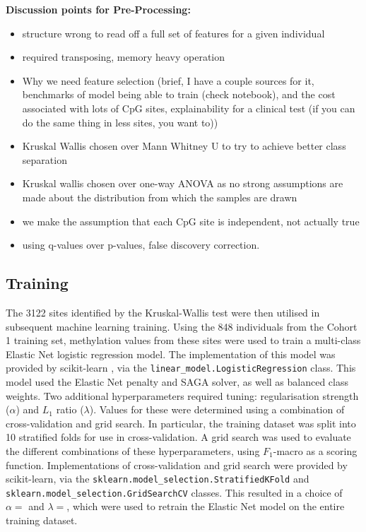 \documentclass{article}
\begin{document}
\vspace{1cm}
\textbf{Discussion points for Pre-Processing:}
\begin{itemize}
    \item structure wrong to read off a full set of features for a given individual
    \item required transposing, memory heavy operation
    \item Why we need feature selection (brief, I have a couple sources for it, benchmarks of model being able to train (check notebook), and the cost associated with lots of CpG sites, explainability for a clinical test (if you can do the same thing in less sites, you want to))
    \item Kruskal Wallis chosen over Mann Whitney U to try to achieve better class separation
    \item Kruskal wallis chosen over one-way ANOVA as no strong assumptions are made about the distribution from which the samples are drawn
    \item we make the assumption that each CpG site is independent, not actually true
    \item using q-values over p-values, false discovery correction.
\end{itemize}

\subsection{Training} \label{sec:training}

The \num{3122} sites identified by the Kruskal-Wallis test were then utilised in subsequent machine learning training. Using the 848 individuals from the Cohort 1 training set, methylation values from these sites were used to train a multi-class Elastic Net logistic regression model. The implementation of this model was provided by scikit-learn \cite{scikit-learn}, via the \verb|linear_model.LogisticRegression| class. This model used the Elastic Net penalty and SAGA solver, as well as balanced class weights. Two additional hyperparameters required tuning: regularisation strength (\(\alpha\)) and \(L_1\) ratio (\(\lambda\)). Values for these were determined using a combination of cross-validation and grid search. In particular, the training dataset was split into 10 stratified folds for use in cross-validation. A grid search was used to evaluate the different combinations of these hyperparameters, using \(F_1\)-macro as a scoring function. Implementations of cross-validation and grid search were provided by scikit-learn, via the \verb|sklearn.model_selection.StratifiedKFold| and \verb|sklearn.model_selection.GridSearchCV| classes. This resulted in a choice of \(\alpha =\) and \(\lambda =\), which were used to retrain the Elastic Net model on the entire training dataset.
\end{document}
